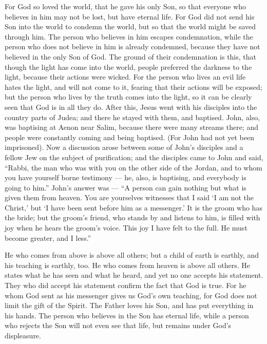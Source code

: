  For God so loved the world, that he gave his only Son, so
that everyone who believes in him may not be lost, but have eternal
life.  For God did not send his Son into the world to
condemn the world, but so that the world might be saved through him.
 The person who believes in him escapes condemnation, while
the person who does not believe in him is already condemned, because
they have not believed in the only Son of God.  The ground
of their condemnation is this, that though the light has come into the
world, people preferred the darkness to the light, because their actions
were wicked.  For the person who lives an evil life hates
the light, and will not come to it, fearing that their actions will be
exposed;  but the person who lives by the truth comes into
the light, so it can be clearly seen that God is in all they do.
 After this, Jesus went with his disciples into the country
parts of Judea; and there he stayed with them, and baptised.
 John, also, was baptising at Aenon near Salim, because
there were many streams there; and people were constantly coming and
being baptised.  (For John had not yet been imprisoned).
 Now a discussion arose between some of John's disciples
and a fellow Jew on the subject of purification;  and the
disciples came to John and said, ``Rabbi, the man who was with you on
the other side of the Jordan, and to whom you have yourself borne
testimony --- he, also, is baptising, and everybody is going to him.''
 John's answer was --- ``A person can gain nothing but what
is given them from heaven.  You are yourselves witnesses
that I said `I am not the Christ,' but `I have been sent before him as a
messenger.'  It is the groom who has the bride; but the
groom's friend, who stands by and listens to him, is filled with joy
when he hears the groom's voice. This joy I have felt to the full.
 He must become greater, and I less.''

 He who comes from above is above all others; but a child
of earth is earthly, and his teaching is earthly, too. He who comes from
heaven is above all others.  He states what he has seen and
what he heard, and yet no one accepts his statement.  They
who did accept his statement confirm the fact that God is true.
 For he whom God sent as his messenger gives us God's own
teaching, for God does not limit the gift of the Spirit. 
The Father loves his Son, and has put everything in his hands.
 The person who believes in the Son has eternal life, while
a person who rejects the Son will not even see that life, but remains
under God's displeasure.

